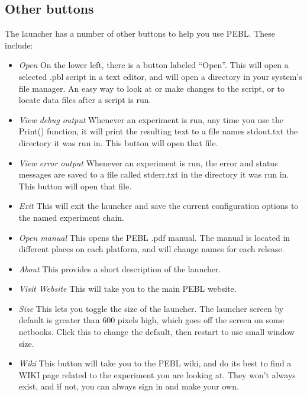 \subsection{Other buttons}
The launcher has a number of other buttons to help you use PEBL.
These include:
\begin{itemize}

\item \emph{Open} On the lower left, there is a button labeled ``Open''.  This
  will open a selected .pbl script in a text editor, and will open a
  directory in your system's file manager.  An easy way to look at or
  make changes to the script, or to locate data files after a script is run. 

\item \emph{View debug output} Whenever an experiment is run, any time
  you use the Print() function, it will print the resulting text to a
  file names stdout.txt the directory it was run in.  This button will
  open that file.

\item \emph{View error output} Whenever an experiment is run, the
  error and status messages are saved to a file called stderr.txt in
  the directory it was run in.  This button will open that file.

\item \emph{Exit} This will exit the launcher and save the current
  configuration options to the named experiment chain.

\item \emph{Open manual} This opens the PEBL .pdf manual.  The manual
  is located in different places on each platform, and will change
  names for each release.

\item \emph{About} This provides a short description of the launcher.

\item \emph{Visit Website}  This will take you to the main PEBL website.

\item \emph{Size}  This lets you toggle the size of the launcher.  The launcher screen by default is greater than 600 pixels high, which goes off the screen on some netbooks.  Click this to change the default, then restart to use small window size.

\item \emph{Wiki} This button will take you to the PEBL wiki, and do
  its best to find a WIKI page related to the experiment you are
  looking at. They won't always exist, and if not, you can always sign
  in and make your own.

\end{itemize}

